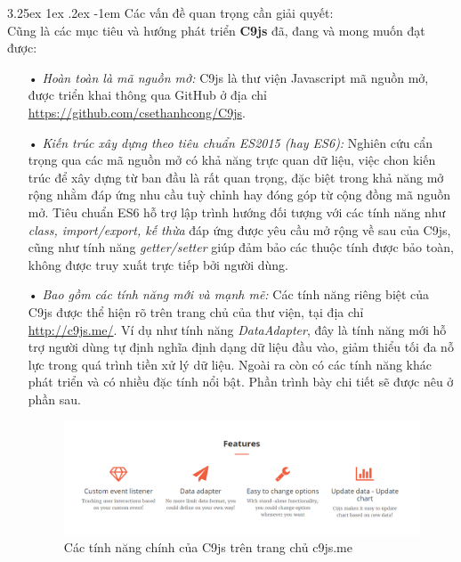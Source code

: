 \documentclass[12pt,a4paper,twoside]{article}
\makeatletter
\newcommand{\myparagraph}[1]{\paragraph{#1}\mbox{}\\} %
\renewcommand\paragraph{\@startsection{paragraph}{5}{\z@}%
  {3.25ex \@plus1ex \@minus.2ex}%
  {-1em}%
  {\normalfont\normalsize\bfseries}}
\makeatother
\begin{document}
\myparagraph{Các vấn đề quan trọng cần giải quyết:}
Cũng là các mục tiêu và hướng phát triển \textbf{C9js} đã, đang và mong muốn đạt được: 
\begin{itemize}
\item[•] \emph{Hoàn toàn là mã nguồn mở:} C9js là thư viện Javascript mã nguồn mở, được triển khai thông qua GitHub ở địa chỉ \url{https://github.com/csethanhcong/C9js}.

\item[•] \emph{Kiến trúc xây dựng theo tiêu chuẩn ES2015 (hay ES6):} Nghiên cứu cẩn trọng qua các mã nguồn mở có khả năng trực quan dữ liệu, việc chon kiến trúc để xây dựng từ ban đầu là rất quan trọng, đặc biệt trong khả năng mở rộng nhằm đáp ứng nhu cầu tuỳ chỉnh hay đóng góp từ cộng đồng mã nguồn mở. Tiêu chuẩn ES6 hỗ trợ lập trình hướng đối tượng với các tính năng như \textit{class, import/export, kế thừa} đáp ứng được yêu cầu mở rộng về sau của C9js, cũng như tính năng \textit{getter/setter} giúp đảm bảo các thuộc tính được bảo toàn, không được truy xuất trực tiếp bởi người dùng.

\item[•] \emph{Bao gồm các tính năng mới và mạnh mẽ:}
Các tính năng riêng biệt của C9js được thể hiện rõ trên trang chủ của thư viện, tại địa chỉ \url{http://c9js.me/}. Ví dụ như tính năng \textit{DataAdapter}, đây là tính năng mới hỗ trợ người dùng tự định nghĩa định dạng dữ liệu đầu vào, giảm thiểu tối đa nỗ lực trong quá trình tiền xử lý dữ liệu. Ngoài ra còn có các tính năng khác phát triển và có nhiều đặc tính nổi bật. Phần trình bày chi tiết sẽ được nêu ở phần sau.

\begin{figure}[!h]
	\begin{center}
    \includegraphics[scale=.5]{image/c9js_feature}
    \caption{Các tính năng chính của C9js trên trang chủ c9js.me}
    \label{fig:c9js_feature}
	\end{center}
\end{figure}

\end{itemize}
\end{document}
